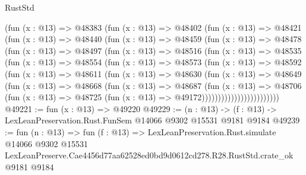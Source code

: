 \begin{lexlean}{RustStd}
\begin{coremodule}
            (fun (x : @13) =>
            @48383
              (fun (x : @13) =>
              @48402
                (fun (x : @13) =>
                @48421
                  (fun (x : @13) =>
                  @48440
                    (fun (x : @13) =>
                    @48459
                      (fun (x : @13) =>
                      @48478
                        (fun (x : @13) =>
                        @48497
                          (fun (x : @13) =>
                          @48516
                            (fun (x : @13) =>
                            @48535
                              (fun (x : @13) =>
                              @48554
                                (fun (x : @13) =>
                                @48573
                                  (fun (x : @13) =>
                                  @48592
                                    (fun (x : @13) =>
                                    @48611
                                      (fun (x : @13) =>
                                      @48630
                                        (fun (x : @13) =>
                                        @48649
                                          (fun (x : @13) =>
                                          @48668
                                            (fun (x : @13) =>
                                            @48687
                                              (fun (x : @13) =>
                                              @48706
                                                (fun (x : @13) =>
                                                @48725
                                                  (fun (x : @13) => @49172))))))))))))))))))))))))
@49221 := fun (x : @13) => @49220
@49229 := (n : @13) -> (f : @13) -> LexLeanPreservation.Rust.FunSem @14066 @9302 @15531 @9181 @9184
@49239 := fun (n : @13) =>
  fun (f : @13) =>
  LexLeanPreservation.Rust.simulate
    @14066
    @9302
    @15531
    LexLeanPreserve.Cae4456d77aa62528ed0bd9d0612cd278.R28.RustStd.crate_ok
    @9181
    @9184
\end{coremodule}
\end{lexlean}

